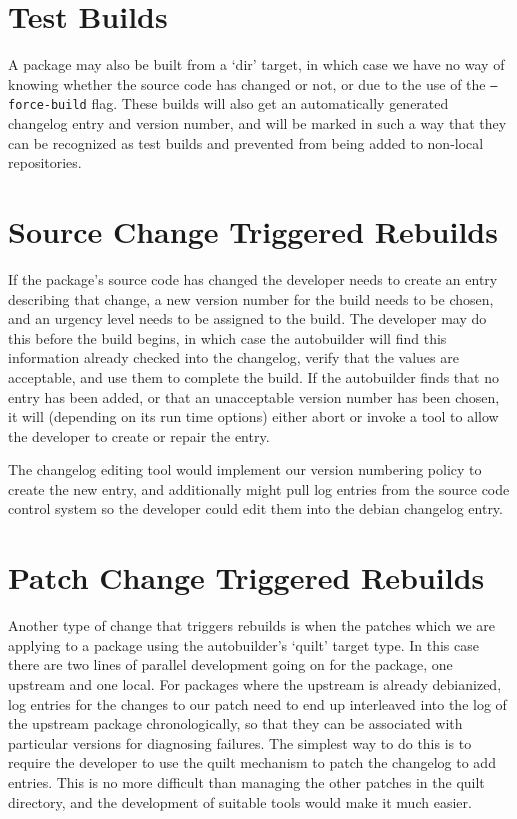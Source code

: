 \documentclass[12pt]{article}
\begin{document}
\section{Test Builds}

A package may also be built from a `dir' target, in which case we have
no way of knowing whether the source code has changed or not, or due
to the use of the {\tt --force-build} flag.  These builds will also get an
automatically generated changelog entry and version number, and will
be marked in such a way that they can be recognized as test builds and
prevented from being added to non-local repositories.

\section{Source Change Triggered Rebuilds}

If the package's source code has changed the developer needs to create
an entry describing that change, a new version number for the build
needs to be chosen, and an urgency level needs to be assigned to the
build.  The developer may do this before the build begins, in which
case the autobuilder will find this information already checked into
the changelog, verify that the values are acceptable, and use them to
complete the build.  If the autobuilder finds that no entry has been
added, or that an unacceptable version number has been chosen, it will
(depending on its run time options) either abort or invoke a tool to
allow the developer to create or repair the entry.

The changelog editing tool would implement our version numbering
policy to create the new entry, and additionally might pull log
entries from the source code control system so the developer could
edit them into the debian changelog entry.

\section{Patch Change Triggered Rebuilds}

Another type of change that triggers rebuilds is when the patches
which we are applying to a package using the autobuilder's `quilt'
target type.  In this case there are two lines of parallel development
going on for the package, one upstream and one local.  For packages
where the upstream is already debianized, log entries for the changes
to our patch need to end up interleaved into the log of the upstream
package chronologically, so that they can be associated with
particular versions for diagnosing failures.  The simplest way to do
this is to require the developer to use the quilt mechanism to patch
the changelog to add entries.  This is no more difficult than managing
the other patches in the quilt directory, and the development of
suitable tools would make it much easier.
\end{document}
